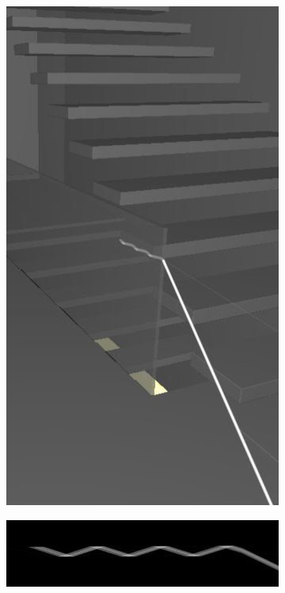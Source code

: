 \begin{figure}
	\centering
	\begin{subfigure}[t]{0.2\linewidth}
		\includegraphics[width=\textwidth]{chapters/chapter_results/opticfiber_ext}
		\caption{ }
	\end{subfigure}
	\begin{subfigure}[t]{0.79\linewidth}
		\includegraphics[width=\textwidth]{chapters/chapter_results/opticfiber}
		\caption{ }
	\end{subfigure}


\end{figure}
